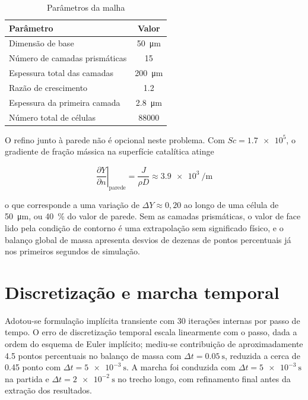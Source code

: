 \begin{table}[htb]
\centering
\caption{Parâmetros da malha}
\label{tab:malha}
\begin{tabular}{l c}
\toprule
Parâmetro & Valor \\
\midrule
Dimensão de base                      & \SI{50}{\micro\meter} \\
Número de camadas prismáticas         & \num{15} \\
Espessura total das camadas           & \SI{200}{\micro\meter} \\
Razão de crescimento                  & \num{1.2} \\
Espessura da primeira camada          & \SI{2.8}{\micro\meter} \\
Número total de células               & \num{88000} \\
\bottomrule
\end{tabular}
\end{table}

O refino junto à parede não é opcional neste problema. Com $Sc = \num{1.7e5}$, o
gradiente de fração mássica na superfície catalítica atinge

\begin{equation}
\left. \frac{\partial Y}{\partial n} \right|_{\text{parede}}
= \frac{J}{\rho D} \approx \SI{3.9e3}{\per\meter}
\end{equation}

\noindent
o que corresponde a uma variação de $\Delta Y \approx 0{,}20$ ao longo de uma
célula de \SI{50}{\micro\meter}, ou \SI{40}{\percent} do valor de parede. Sem as
camadas prismáticas, o valor de face lido pela condição de contorno é uma
extrapolação sem significado físico, e o balanço global de massa apresenta
desvios de dezenas de pontos percentuais já nos primeiros segundos de simulação.

\section{Discretização e marcha temporal}

Adotou-se formulação implícita transiente com \num{30} iterações internas por
passo de tempo. O erro de discretização temporal escala linearmente com o passo,
dada a ordem do esquema de Euler implícito; mediu-se contribuição de
aproximadamente \num{4.5} pontos percentuais no balanço de massa com
$\Delta t = \SI{0.05}{\second}$, reduzida a cerca de \num{0.45} ponto com
$\Delta t = \SI{5e-3}{\second}$. A marcha foi conduzida com
$\Delta t = \SI{5e-3}{\second}$ na partida e $\Delta t = \SI{2e-2}{\second}$ no
trecho longo, com refinamento final antes da extração dos resultados.

